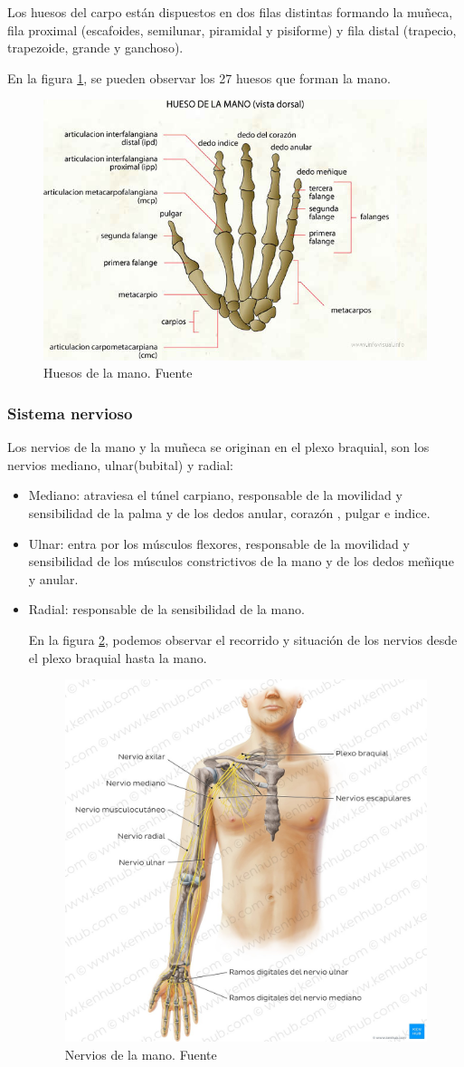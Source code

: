 Los huesos del carpo están dispuestos en dos filas distintas formando la muñeca, fila proximal (escafoides, semilunar, piramidal y pisiforme) y fila distal (trapecio, trapezoide, grande y ganchoso).

En la figura \ref{fig:Huesos_mano}, se pueden observar los 27 huesos que forman la mano.
\begin{figure}
    \centering
    \includegraphics[width=0.6\linewidth]{img/Huesos_mano.png}
    \caption{Huesos de la mano. Fuente }
    \label{fig:Huesos_mano}
\end{figure}
\subsubsection{Sistema nervioso}

Los nervios de la mano y la muñeca se originan en el plexo braquial, son los nervios mediano, ulnar(bubital) y radial:
\begin{itemize}
    \item Mediano: atraviesa el túnel carpiano, responsable de la movilidad y sensibilidad de la palma y de los dedos anular, corazón , pulgar e indice.
    \item Ulnar: entra por los músculos flexores, responsable de la movilidad y sensibilidad de los músculos constrictivos de la mano y de los dedos meñique y anular.
    \item Radial: responsable de la sensibilidad de la mano.

En la figura \ref{fig:nervios de la mano}, podemos observar el recorrido y situación de los nervios desde el plexo braquial hasta la mano.
\begin{figure}
    \centering
    \includegraphics[width=0.5\linewidth]{img/Mano_nervios.png}
    \caption{Nervios de la mano. Fuente}
    \label{fig:nervios de la mano}
\end{figure}
\end{itemize}

